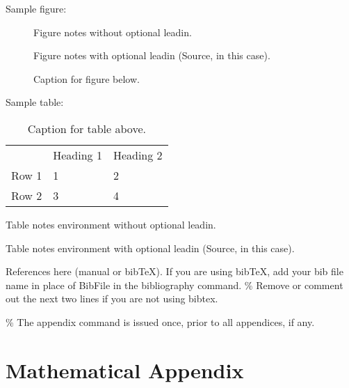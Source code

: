 \documentclass[]{AEA}
\begin{document}
Sample figure:

\begin{figure}

\caption{Caption for figure below.}
\begin{figurenotes}
Figure notes without optional leadin.
\end{figurenotes}
\begin{figurenotes}[Source]
Figure notes with optional leadin (Source, in this case).
\end{figurenotes}
\end{figure}

Sample table:

\begin{table}
\caption{Caption for table above.}

\begin{tabular}{lll}
& Heading 1 & Heading 2 \\
Row 1 & 1 & 2 \\
Row 2 & 3 & 4%
\end{tabular}
\begin{tablenotes}
Table notes environment without optional leadin.
\end{tablenotes}
\begin{tablenotes}[Source]
Table notes environment with optional leadin (Source, in this case).
\end{tablenotes}
\end{table}

References here (manual or bibTeX). If you are using bibTeX, add your
bib file name in place of BibFile in the bibliography command. \% Remove
or comment out the next two lines if you are not using bibtex.




\% The appendix command is issued once, prior to all appendices, if any.
\appendix

\section{Mathematical Appendix}
\end{document}

